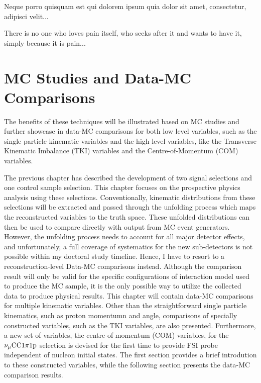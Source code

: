 \begin{savequote}[8cm]
\textlatin{Neque porro quisquam est qui dolorem ipsum quia dolor sit amet, consectetur, adipisci velit...}

There is no one who loves pain itself, who seeks after it and wants to have it, simply because it is pain...
\end{savequote}

\chapter{\label{ch:5-mcdata}MC Studies and Data-MC Comparisons} 

\minitoc


The benefits of these techniques will be illustrated based on MC studies and further showcase in data-MC comparisons for both low level variables, such as the single particle kinematic variables and the high level variables, like the Transverse Kinematic Imbalance (TKI) variables and the Centre-of-Momentum (COM) variables. 


The previous chapter has described the development of two signal selections and one control sample selection. This chapter focuses on the prospective physics analysis using these selections.
Conventionally, kinematic distributions from these selections will be extracted and passed through the unfolding process which maps the reconstructed variables to the truth space. 
These unfolded distributions can then be used to compare directly with output from MC event generators.
However, the unfolding process needs to account for all major detector effects, and unfortunately, a full coverage of systematics for the new sub-detectors is not possible within my doctoral study timeline.
Hence, I have to resort to a reconstruction-level Data-MC comparisons instead.
Although the comparison result will only be valid for the specific configurations of interaction model used to produce the MC sample, it is the only possible way to utilize the collected data to produce physical results.
This chapter will contain data-MC comparisons for multiple kinematic variables. 
Other than the straightforward single particle kinematics, such as proton momentumn and angle, comparisons of specially constructed variables, such as the TKI variables, are also presented. 
Furthermore, a new set of variables, the centre-of-momentum (COM) variables, for the $\nu_{\mu}\textrm{CC}1\pi1\textrm{p}$ selection is devised for the first time to provide FSI probe independent of nucleon initial states.
The first section provides a brief introdution to these constructed variables, while the following section presents the data-MC comparison results.

